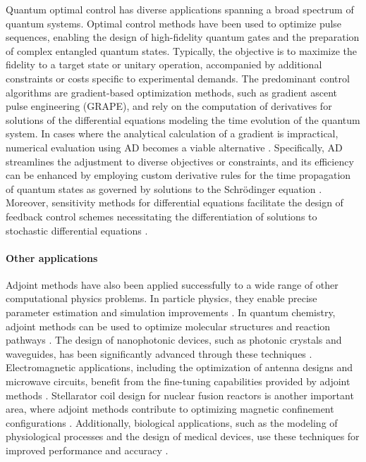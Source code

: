 Quantum optimal control has diverse applications spanning a broad spectrum of quantum systems. 
Optimal control methods have been used to optimize pulse sequences, enabling the design of high-fidelity quantum gates and the preparation of complex entangled quantum states. 
Typically, the objective is to maximize the fidelity to a target state or unitary operation, accompanied by additional constraints or costs specific to experimental demands. 
The predominant control algorithms are gradient-based optimization methods, such as gradient ascent pulse engineering (GRAPE), and rely on the computation of derivatives for solutions of the differential equations modeling the time evolution of the quantum system. 
In cases where the analytical calculation of a gradient is impractical, numerical evaluation using AD becomes a viable alternative \cite{jirari:2009, leung:2017, abdelhafez:2019, jirari2019quantum, abdelhafez:2020, schaefer:2020, goerz:2022}. 
Specifically, AD streamlines the adjustment to diverse objectives or constraints, and its efficiency can be enhanced by employing custom derivative rules for the time propagation of quantum states as governed by solutions to the Schrödinger equation \cite{goerz:2022}. 
Moreover, sensitivity methods for differential equations facilitate the design of feedback control schemes necessitating the differentiation of solutions to stochastic differential equations \cite{schaefer:2021}.

\paragraph{Other applications}

Adjoint methods have also been applied successfully to a wide range of other computational physics problems. 
In particle physics, they enable precise parameter estimation and simulation improvements \cite{Dorigo.2022}.
In quantum chemistry, adjoint methods can be used to optimize molecular structures and reaction pathways \cite{Arrazola.2021}. 
The design of nanophotonic devices, such as photonic crystals and waveguides, has been significantly advanced through these techniques \cite{Molesky_Lin_Piggott_Jin_Vucković_Rodriguez_2018}. 
Electromagnetic applications, including the optimization of antenna designs and microwave circuits, benefit from the fine-tuning capabilities provided by adjoint methods \cite{Georgieva_Glavic_Bakr_Bandler_2002}. 
Stellarator coil design for nuclear fusion reactors is another important area, where adjoint methods contribute to optimizing magnetic confinement configurations \cite{McGreivy_stellarator_2021}.
Additionally, biological applications, such as the modeling of physiological processes and the design of medical devices, use these techniques for improved performance and accuracy \cite{Strouwen2022}.


